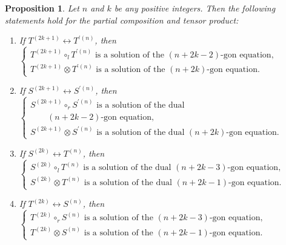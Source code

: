 \documentclass[10pt,a4paper]{amsart}
\numberwithin{equation}{section}
\newtheorem{Proposition}[Theorem]{Proposition}
\theoremstyle{definition}
\begin{document}
\begin{Proposition}\label{prop:commpolygon}
 Let $n$ and $k$ be any positive integers.
 Then the following statements hold for the partial composition and tensor product:
 \begin{enumerate}\itemsep=0pt
 \item[$(1)$] If $T^{(2k+1)}\leftrightarrow T^{\prime(n)}$, then
 $
 \begin{cases}
 \text{$T^{(2k+1)}\circ_l T^{\prime(n)}$ is a solution of the $(n+2k-2)$-gon equation,}\\
 \text{$T^{(2k+1)}\otimes T^{\prime(n)}$ is a solution of the $(n+2k)$-gon equation.}
 \end{cases} $\!\!
 \item[$(2)$] If $S^{(2k+1)}\leftrightarrow S^{\prime(n)}$, then
 $
 \begin{cases}
 \text{$S^{(2k+1)}\circ_r S^{\prime(n)}$ is a solution of the dual}\\[-1mm]
 \qquad \text{$(n+2k-2)$-gon equation,}\\
 \text{$S^{(2k+1)}\otimes S^{\prime(n)}$ is a solution of the dual $(n+2k)$-gon equation.}
 \end{cases} $\!\!\!\!
 \item[$(3)$] If $S^{(2k)}\leftrightarrow T^{(n)}$, then
 $
 \begin{cases}
 \text{$S^{(2k)}\circ_lT^{(n)}$ is a solution of the dual $(n+2k-3)$-gon equation,}\\
 \text{$S^{(2k)}\otimes T^{(n)}$ is a solution of the dual $(n+2k-1)$-gon equation.}
 \end{cases}
 $
 \item[$(4)$] If $T^{(2k)}\leftrightarrow S^{(n)}$, then
 $
 \begin{cases}
 \text{$T^{(2k)}\circ_rS^{(n)}$ is a solution of the $(n+2k-3)$-gon equation,}\\
 \text{$T^{(2k)}
 \otimes S^{(n)}$ is a solution of the $(n+2k-1)$-gon equation.}
 \end{cases}
 $
\end{enumerate}
\end{Proposition}
\end{document}
